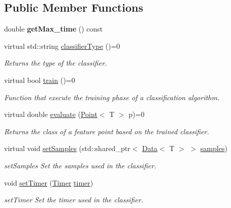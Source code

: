 \subsection*{Public Member Functions}
\begin{DoxyCompactItemize}
\item 
double {\bfseries get\+Max\+\_\+time} () const \hypertarget{class_classifier_a9e791e66641bf34ce0ce09e8897287ea}{}\label{class_classifier_a9e791e66641bf34ce0ce09e8897287ea}

\item 
virtual std\+::string \hyperlink{class_classifier_ab40f42f957ec50939bd9a6b0cd5d1786}{classifier\+Type} ()=0
\begin{DoxyCompactList}\small\item\em Returns the type of the classifier. \end{DoxyCompactList}\item 
virtual bool \hyperlink{class_classifier_a120849bfdfa3ba7a0388b32b2d76bf4f}{train} ()=0
\begin{DoxyCompactList}\small\item\em Function that execute the training phase of a classification algorithm. \end{DoxyCompactList}\item 
virtual double \hyperlink{class_classifier_ab3b9544a8d9c3cbde8d5865c7e9be0fb}{evaluate} (\hyperlink{class_point}{Point}$<$ T $>$ p)=0
\begin{DoxyCompactList}\small\item\em Returns the class of a feature point based on the trained classifier. \end{DoxyCompactList}\item 
virtual void \hyperlink{class_classifier_ad32dac7fcf649c5642c39f2ea22f3fde}{set\+Samples} (std\+::shared\+\_\+ptr$<$ \hyperlink{class_data}{Data}$<$ T $>$ $>$ \hyperlink{class_classifier_a0000b47a2e0784ada4c52d7046c4adb8}{samples})
\begin{DoxyCompactList}\small\item\em set\+Samples Set the samples used in the classifier. \end{DoxyCompactList}\item 
void \hyperlink{class_classifier_ad86224f59e1c7722fa34f63707bf0221}{set\+Timer} (\hyperlink{class_timer}{Timer} \hyperlink{class_classifier_a7426be6798e9a184e6d968f91a361a93}{timer})
\begin{DoxyCompactList}\small\item\em set\+Timer Set the timer used in the classifier. \end{DoxyCompactList}\item 

\end{DoxyCompactItemize}
